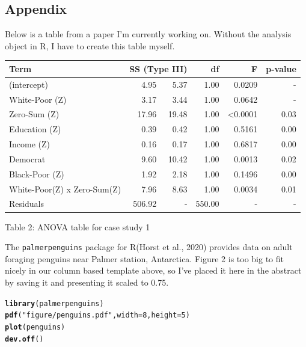 \documentclass{article}\usepackage[]{graphicx}\usepackage[]{xcolor}
\makeatletter
\newcommand{\hlnum}[1]{\textcolor[rgb]{0.686,0.059,0.569}{#1}}%
\newcommand{\hlsng}[1]{\textcolor[rgb]{0.192,0.494,0.8}{#1}}%
\newcommand{\hldef}[1]{\textcolor[rgb]{0.345,0.345,0.345}{#1}}%
\newcommand{\hlkwc}[1]{\textcolor[rgb]{0.333,0.667,0.333}{#1}}%
\newcommand{\hlkwd}[1]{\textcolor[rgb]{0.737,0.353,0.396}{\textbf{#1}}}%
\newenvironment{kframe}{%
 \def\at@end@of@kframe{}%
 \ifinner\ifhmode%
  \def\at@end@of@kframe{\end{minipage}}%
  \begin{minipage}{\columnwidth}%
 \fi\fi%
 \def\FrameCommand##1{\hskip\@totalleftmargin \hskip-\fboxsep
 \colorbox{shadecolor}{##1}\hskip-\fboxsep
     \hskip-\linewidth \hskip-\@totalleftmargin \hskip\columnwidth}%
 \MakeFramed {\advance\hsize-\width
   \@totalleftmargin\z@ \linewidth\hsize
   \@setminipage}}%
 {\par\unskip\endMakeFramed%
 \at@end@of@kframe}
\newenvironment{knitrout}{}{} %
\makeatother
\begin{document}
\begin{multicols}{2}
\section{Appendix}
Below is a table from a paper I’m currently working on. Without the analysis object in R, I have to create this table myself.
\begin{table}[H]
\begin{center}
\begin{tabular}{| l | r | r | r | r | r |} \hline
Term & \multicolumn{2}{|c|}{SS (Type III)} & df & F & p-value \\ \hline
(intercept) & 4.95 & 5.37 & 1.00 & 0.0209 & - \\ 
White-Poor (Z) & 3.17 & 3.44 & 1.00 & 0.0642 & - \\ 
Zero-Sum (Z) & 17.96 & 19.48 & 1.00 & <0.0001 & 0.03 \\ 
Education (Z) & 0.39 & 0.42 & 1.00 & 0.5161 & 0.00 \\ 
Income (Z) & 0.16 & 0.17 & 1.00 & 0.6817 & 0.00 \\ 
Democrat & 9.60 & 10.42 & 1.00 & 0.0013 & 0.02 \\ 
Black-Poor (Z) & 1.92 & 2.18 & 1.00 & 0.1496 & 0.00 \\ 
White-Poor(Z) x Zero-Sum(Z) & 7.96 & 8.63 & 1.00 & 0.0034 & 0.01 \\ 
Residuals & 506.92 & - & 550.00 & - & - \\ \hline
\end{tabular}
\label{paper.tab}
\newline Table 2: ANOVA table for case study 1
\end{center}
\end{table}
\indent The \texttt{palmerpenguins} package for R(Horst et al., 2020) provides data on adult foraging penguins near Palmer station, Antarctica. Figure 2 is too big to fit nicely in our column based template above, so I've placed it here in the abstract by saving it and presenting it scaled to 0.75.
\begin{knitrout}
\color{fgcolor}\begin{kframe}
\begin{alltt}
\hlkwd{library}\hldef{(palmerpenguins)}
\hlkwd{pdf}\hldef{(}\hlsng{"figure/penguins.pdf"}\hldef{,} \hlkwc{width}\hldef{=}\hlnum{8}\hldef{,}\hlkwc{height}\hldef{=}\hlnum{5}\hldef{)}
\hlkwd{plot}\hldef{(penguins)}
\hlkwd{dev.off}\hldef{()}
\end{alltt}
\begin{verbatim}

\end{verbatim}
\end{kframe}
\end{knitrout}
\end{multicols}
\end{document}
